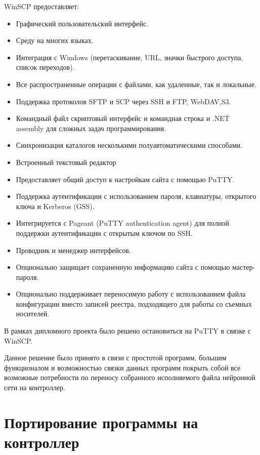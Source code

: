 WinSCP предоставляет:

\begin{itemize}
    \item[-] Графический пользовательский интерфейс.  
    \item[-] Среду на многих языках.
    \item[-] Интеграция с Windows (перетаскивание, URL, значки быстрого доступа, список переходов). 
    \item[-] Все распространенные операции с файлами, как удаленные, так и локальные.  
    \item[-] Поддержка протоколов SFTP и SCP через SSH и FTP, WebDAV,S3. 
    \item[-]  Командный файл скриптовый интерфейс и командная строка и .NET assembly для сложных задач программирования.
    \item[-] Синхронизация каталогов несколькими полуавтоматическими способами.
    \item[-] Встроенный текстовый редактор
    \item[-] Предоставляет общий доступ к настройкам сайта с помощью PuTTY.
    \item[-] Поддержка аутентификации с использованием пароля, клавиатуры, открытого ключа и Kerberos (GSS). 
    \item[-] Интегрируется с Pageant (PuTTY authentication agent) для полной поддержки аутентификации с открытым ключом по SSH.
    \item[-] Проводник и менеджер интерфейсов. 
    \item[-] Опционально защищает сохраненную информацию сайта с помощью мастер-пароля.
    \item[-] Опционально поддерживает переносимую работу с использованием файла конфигурации вместо записей реестра, подходящего для работы со съемных носителей.
\end{itemize}

В рамках дипломного проекта было решено остановиться на PuTTY в связке с WinSCP. 

Данное решение было принято в связи с простотой программ, большим функционалом и возможностью связки данных программ покрыть собой все возможные потребности по переносу собранного исполняемого файла нейронной сети на контроллер.

\section{Портирование программы на контроллер}

